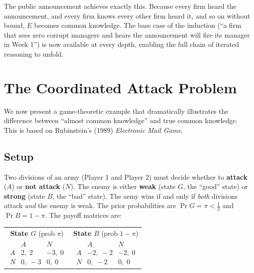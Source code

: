 The public announcement achieves exactly this. Because every firm heard the announcement, and every firm knows every other firm heard it, and so on without bound, $E$ becomes common knowledge. The base case of the induction (``a firm that sees zero corrupt managers and hears the announcement will fire its manager in Week 1'') is now available at every depth, enabling the full chain of iterated reasoning to unfold.

\section{The Coordinated Attack Problem}

We now present a game-theoretic example that dramatically illustrates the difference between ``almost common knowledge'' and true common knowledge. This is based on Rubinstein's (1989) \textit{Electronic Mail Game}.

\subsection{Setup}

Two divisions of an army (Player 1 and Player 2) must decide whether to \textbf{attack} ($A$) or \textbf{not attack} ($N$). The enemy is either \textbf{weak} (state $G$, the ``good'' state) or \textbf{strong} (state $B$, the ``bad'' state). The army wins if and only if \textit{both} divisions attack \textit{and} the enemy is weak. The prior probabilities are $\Pr{G} = \pi < \frac{1}{2}$ and $\Pr{B} = 1 - \pi$.
The payoff matrices are:

\begin{center}
\begin{tabular}{cc}
\textbf{State $G$} (prob $\pi$) & \textbf{State $B$} (prob $1-\pi$) \\[6pt]
$\begin{array}{c|cc}
 & A & N \\ \hline
A & 2,\;2 & -3,\;0 \\
N & 0,\;-3 & 0,\;0
\end{array}$
&
$\begin{array}{c|cc}
 & A & N \\ \hline
A & -2,\;-2 & -2,\;0 \\
N & 0,\;-2 & 0,\;0
\end{array}$
\end{tabular}
\end{center}

